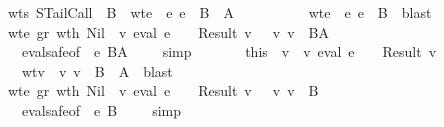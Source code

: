 \begin{isabellebody}
\ \ \ \ \ \ \isamarkupfalse \ wts\ STailCall\ \isamarkupfalse \ B\ \ wte{}{\isacharcolon}\ {\isachardoublequoteopen}{\isasymGamma}\ {\isasymturnstile}\isactrlisub e\ e{}\ {\isacharcolon}\ B\ {\isasymrightarrow}\ A{\isacharprime}{\isachardoublequoteclose}\ \isanewline
\ \ \ \ \ \ \ \ \ wte{}{\isacharcolon}\ {\isachardoublequoteopen}{\isasymGamma}\ {\isasymturnstile}\isactrlisub e\ e{}\ {\isacharcolon}\ B{\isachardoublequoteclose}\ \isamarkupfalse \ blast\isanewline
\ \ \ \ \ \ \isamarkupfalse \ wte{}\ gr\ wt{\isacharunderscore}h\ Nil\ \isamarkupfalse \ {\isachardoublequoteopen}{\isacharparenleft}{\isasymexists}v{}{\isachardot}\ eval\ e{}\ {\isasymrho}\ {\isasymmu}\ {\isacharequal}\ Result\ v{}\ {\isasymand}\ {\isasymSigma}\ {\isasymturnstile}v\ v{}\ {\isacharcolon}\ B{\isasymrightarrow}A{\isacharprime}{\isacharparenright}{\isachardoublequoteclose}\isanewline
\ \ \ \ \ \ \ \ \isamarkupfalse \ eval{\isacharunderscore}safe{\isacharbrackleft}of\ {\isasymGamma}\ e{}\ {\isachardoublequoteopen}B{\isasymrightarrow}A{\isacharprime}{\isachardoublequoteclose}\ {\isasymSigma}\ {\isasymrho}\ {\isasymmu}{\isacharbrackright}\ \isamarkupfalse \ simp\isanewline
\ \ \ \ \ \ \isamarkupfalse \ this\ \isamarkupfalse \ v{}\ \ v{}{\isacharcolon}\ {\isachardoublequoteopen}eval\ e{}\ {\isasymrho}\ {\isasymmu}\ {\isacharequal}\ Result\ v{}{\isachardoublequoteclose}\isanewline
\ \ \ \ \ \ \ \ \ wtv{}{\isacharcolon}\ {\isachardoublequoteopen}{\isasymSigma}\ {\isasymturnstile}v\ v{}\ {\isacharcolon}\ {\isacharparenleft}B\ {\isasymrightarrow}\ A{\isacharprime}{\isacharparenright}{\isachardoublequoteclose}\ \isamarkupfalse \ blast\isanewline
\ \ \ \ \ \ \isamarkupfalse \ wte{}\ gr\ wt{\isacharunderscore}h\ Nil\ \isamarkupfalse \ {\isachardoublequoteopen}{\isacharparenleft}{\isasymexists}v{}{\isachardot}\ eval\ e{}\ {\isasymrho}\ {\isasymmu}\ {\isacharequal}\ Result\ v{}\ {\isasymand}\ {\isasymSigma}\ {\isasymturnstile}v\ v{}\ {\isacharcolon}\ B{\isacharparenright}{\isachardoublequoteclose}\isanewline
\ \ \ \ \ \ \ \ \isamarkupfalse \ eval{\isacharunderscore}safe{\isacharbrackleft}of\ {\isasymGamma}\ e{}\ {\isachardoublequoteopen}B{\isachardoublequoteclose}\ {\isasymSigma}\ {\isasymrho}\ {\isasymmu}{\isacharbrackright}\ \isamarkupfalse \ simp\isanewline

\end{isabellebody}
